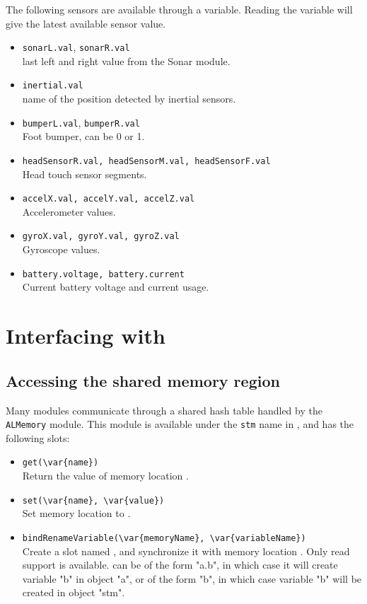 The following sensors are available through a \us variable.
Reading the variable will give the latest available sensor value.

\begin{itemize}
\item \lstinline|sonarL.val|, \lstinline|sonarR.val| \\
    last left and right value from the Sonar module.
\item \lstinline|inertial.val| \\
    name of the position detected by inertial sensors.
\item \lstinline|bumperL.val|, \lstinline|bumperR.val| \\
    Foot bumper, can be 0 or 1.
\item \lstinline|headSensorR.val, headSensorM.val, headSensorF.val| \\
    Head touch sensor segments.
\item \lstinline|accelX.val, accelY.val, accelZ.val| \\
    Accelerometer values.
\item \lstinline|gyroX.val, gyroY.val, gyroZ.val| \\
    Gyroscope values.
\item \lstinline|battery.voltage, battery.current| \\
    Current battery voltage and current usage.
\end{itemize}

\section{Interfacing with \naoqi}

\subsection{Accessing the \naoqi shared memory region}

Many \naoqi modules communicate through a shared hash table handled by
the \lstinline|ALMemory| module. This module is available under the
\lstinline|stm| name in \urbi, and has the following slots:

\begin{itemize}
\item \lstinline|get(\var{name})| \\
  Return the value of memory location .
\item \lstinline|set(\var{name}, \var{value})| \\
  Set memory location  to .
\item \lstinline|bindRenameVariable(\var{memoryName}, \var{variableName})| \\
  Create a \us slot named , and synchronize it with memory
  location . Only read support is available.
   can be of the form "a.b", in which case it will create
  variable "b" in object "a", or of the form "b", in which case variable "b"
  will be created in object "stm".
\end{itemize}

